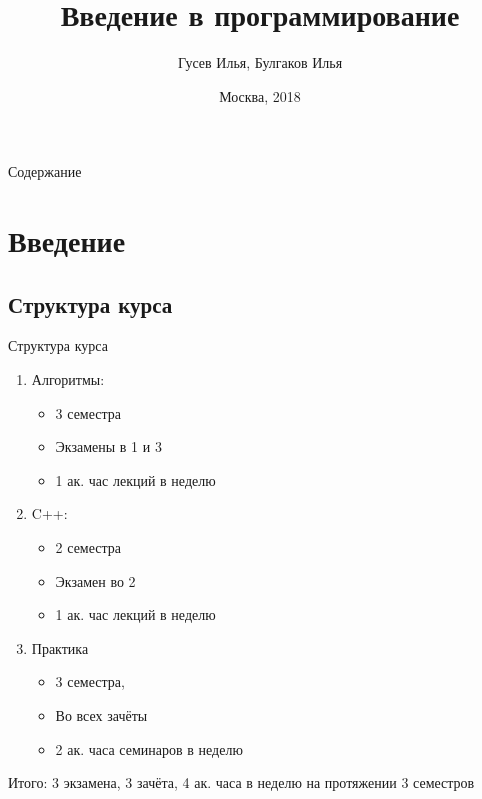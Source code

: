 \documentclass[10pt]{beamer}
\title[\href{https://goo.gl/NRgp8K}{https://goo.gl/NRgp8K} (Term 1)]{Введение в программирование}
\author[Гусев Илья, Булгаков Илья]{Гусев Илья, Булгаков Илья}
\institute[МФТИ] 
{Московский физико-технический институт\\*}
\date{Москва, 2018}
\begin{document}
\begin{frame}
  \titlepage
\end{frame}

\begin{frame}{Содержание}
\tableofcontents
\end{frame}

\section{Введение}

\subsection{Структура курса}
\begin{frame}[fragile]{Структура курса}
\begin{enumerate}
\item Алгоритмы:
    \begin {itemize}
        \item 3 семестра
        \item Экзамены в 1 и 3
        \item 1 ак. час лекций в неделю
    \end {itemize}
\item C++:
    \begin {itemize}
        \item 2 семестра
        \item Экзамен во 2
        \item 1 ак. час лекций в неделю
    \end {itemize}
\item Практика
    \begin {itemize}
        \item 3 семестра,
        \item Во всех зачёты
        \item 2 ак. часа семинаров в неделю
    \end {itemize}
\end{enumerate}
Итого: 3 экзамена, 3 зачёта, 4 ак. часа в неделю на протяжении 3 семестров
\end{frame}
\end{document}
